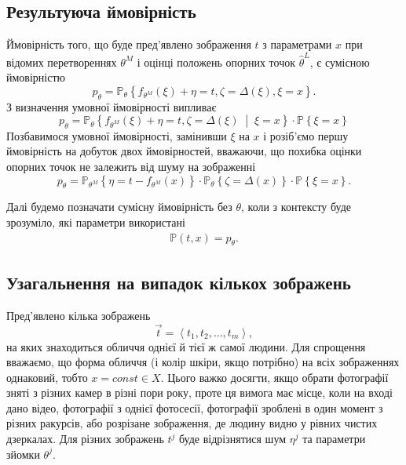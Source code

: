 \subsection{Результуюча ймовірність}

Ймовірність того,
що буде пред'явлено зображення $t$ з параметрами $x$
при відомих перетвореннях $\theta^M$
і оцінці положень опорних точок $\hat{\theta}^L$, є сумісною ймовірністю
\begin{equation*}
  p_{\theta}
  = \mathbb{P}_{\theta}\left\{
    f_{\theta^M}\left( \xi \right) + \eta = t,
    \zeta = \Delta\left( \xi \right),
    \xi = x
  \right\}.
\end{equation*}
З визначення умовної ймовірності випливає
\begin{equation*}
  p_{\theta}
  = \mathbb{P}_{\theta}\left\{
      f_{\theta^M}\left( \xi \right) + \eta = t,
      \zeta = \Delta\left( \xi \right)
      \;\middle|\; \xi = x \right\}
    \cdot \mathbb{P}\left\{ \xi = x \right\}
\end{equation*}
Позбавимося умовної ймовірності, замінивши $\xi$ на $x$
і розіб'ємо першу ймовірність на добуток двох ймовірностей,
вважаючи, що похибка оцінки опорних точок не залежить від шуму на зображенні
\begin{equation*}
  p_{\theta}
  = \mathbb{P}_{\theta^M}\left\{
      \eta = t - f_{\theta^M}\left( x \right) \right\}
    \cdot \mathbb{P}_{\theta}\left\{
      \zeta = \Delta\left( x \right)
    \right\}
    \cdot \mathbb{P}\left\{ \xi = x \right\}.
\end{equation*}

Далі будемо позначати сумісну ймовірність без $\theta$,
коли з контексту буде зрозуміло,
які параметри використані
\begin{align*}
  \mathbb{P}\left( t, x \right) = p_{\theta}.
\end{align*}

\subsection{Узагальнення на випадок кількох зображень}

Пред'явлено кілька зображень
\begin{equation*}
  \vec{t} = \left\langle t_1, t_2, \dots, t_m \right\rangle,
\end{equation*}
на яких знаходиться обличчя однієї й тієї ж самої людини.
Для спрощення вважаємо,
що форма обличчя (і колір шкіри, якщо потрібно)
на всіх зображеннях однаковий, тобто $x = const \in X$.
Цього важко досягти,
якщо обрати фотографії зняті з різних камер в різні пори року,
проте ця вимога має місце,
коли на вході дано відео, фотографії з однієї фотосесії,
фотографії зроблені в один момент з різних ракурсів,
або розрізане зображення, де людину видно у рівних чистих дзеркалах.
Для різних зображень $t^j$ буде відрізнятися
шум $\eta^j$ та параметри зйомки $\theta^j$.

